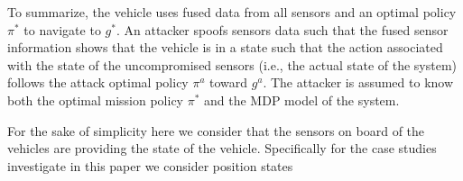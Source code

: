 \documentclass[letterpaper, 10 pt, conference]{ieeeconf}  %
\newcommand\NB[1]{$\spadesuit$\footnote{NB: #1}}
\begin{document}
To summarize, the vehicle uses fused data from all sensors and an optimal policy $\pi^*$ to navigate to $g^*$. An attacker spoofs sensors data such that the fused sensor information shows that the vehicle is in a state such that the action associated with the state of the uncompromised sensors (i.e., the actual state of the system) follows the attack optimal policy $\pi^a$ toward $g^a$. The attacker is assumed to know both the optimal mission policy $\pi^*$ and the MDP model of the system.   

For the sake of simplicity here we consider that the sensors on board of the vehicles are providing the state of the vehicle. Specifically for the case studies investigate in this paper we consider position states

\end{document}
